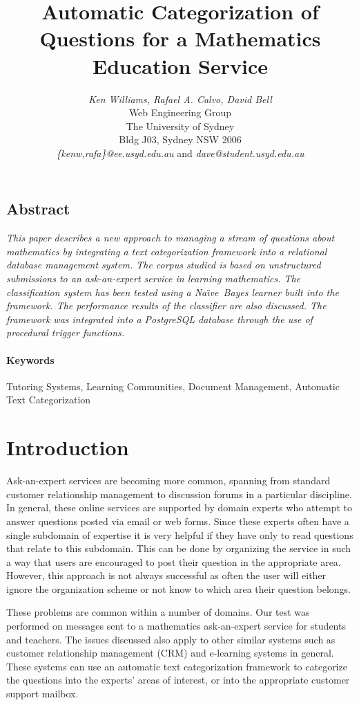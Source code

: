 \documentclass{article}
\title{Automatic Categorization of Questions for a Mathematics Education Service}
\author{
{\em Ken Williams, Rafael A. Calvo, David Bell}\\[1ex]
Web Engineering Group\\
The University of Sydney\\
Bldg J03, Sydney NSW 2006\\[1ex]
{\em {\{kenw,rafa\}}@ee.usyd.edu.au} and
{\em dave@student.usyd.edu.au}
}
\date{}
\newcommand{\naive}{Na\"\i ve}
\begin{document}
\maketitle
\thispagestyle{empty}

\subsection*{\centering Abstract}
\noindent
{\it 
This paper describes a new approach to managing a stream of questions about 
mathematics by integrating a text categorization framework into a relational database 
management system. The corpus studied is based on unstructured submissions to an 
ask-an-expert service in learning mathematics. The classification system has 
been tested using a \naive\ Bayes learner built into the framework. The 
performance results of the classifier are also discussed. The framework was integrated 
into a PostgreSQL database through the use of procedural trigger functions.
}

\paragraph{Keywords} 
Tutoring Systems, Learning Communities, Document Management, Automatic
Text Categorization

\section{Introduction}

Ask-an-expert services are becoming more common, spanning from standard 
customer relationship management to discussion forums in a particular discipline. In 
general, these online services are supported by domain experts who attempt to answer 
questions posted via email or web forms. Since these experts often have a single subdomain of expertise it is 
very helpful if they have only to read questions that relate to this subdomain. This can be 
done by organizing the service in such a way that users are encouraged to post their 
question in the appropriate area. However, this approach is not always successful as 
often the user will either ignore the organization scheme or not know to which area their 
question belongs. 

These problems are common within a number of domains. Our test was performed on 
messages sent to a mathematics ask-an-expert
service for students and teachers.\cite{drmath} The issues 
discussed also apply to other similar systems such as customer relationship 
management (CRM) and e-learning systems in general. These systems can use an 
automatic text categorization framework to categorize the questions into the experts' 
areas of interest, or into the appropriate customer support mailbox. 
\end{document}
